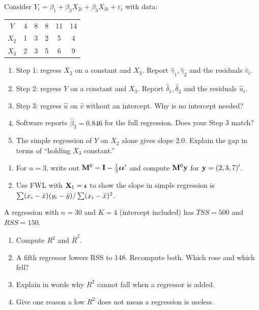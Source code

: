 \documentclass[11pt]{article}
\begin{document}
Consider $Y_i=\beta_1+\beta_2X_{2i}+\beta_3X_{3i}+\varepsilon_i$ with data:
\begin{center}
\begin{tabular}{c|ccccc}
$Y$ & 4 & 8 & 8 & 11 & 14 \\
$X_2$ & 1 & 3 & 2 & 5 & 4 \\
$X_3$ & 2 & 3 & 5 & 6 & 9
\end{tabular}
\end{center}
\begin{enumerate}[label=(\alph*)]
  \item Step 1: regress $X_2$ on a constant and $X_3$. Report $\hat\gamma_1,\hat\gamma_2$ and the residuals $\hat v_i$.
  \item Step 2: regress $Y$ on a constant and $X_3$. Report $\hat\delta_1,\hat\delta_2$ and the residuals $\hat u_i$.
  \item Step 3: regress $\hat u$ on $\hat v$ without an intercept. Why is no intercept needed?
  \item Software reports $\hat\beta_2=0.846$ for the full regression. Does your Step 3 match?
  \item The simple regression of $Y$ on $X_2$ alone gives slope $2.0$. Explain the gap in terms of ``holding $X_3$ constant.''
\end{enumerate}

\begin{enumerate}[label=(\alph*)]
  \item For $n=3$, write out $\mathbf{M}^0=\mathbf{I}-\tfrac13\bm{\iota}\bm{\iota}'$ and compute $\mathbf{M}^0\mathbf y$ for $\mathbf{y}=(2,3,7)'$.
  \item Use FWL with $\mathbf{X}_1=\bm{\iota}$ to show the slope in simple regression is $\sum(x_i-\bar{x})(y_i-\bar{y})/\sum(x_i-\bar{x})^2$.
\end{enumerate}

A regression with $n=30$ and $K=4$ (intercept included) has $TSS=500$ and $RSS=150$.
\begin{enumerate}[label=(\alph*)]
  \item Compute $R^2$ and $\bar R^2$.
  \item A fifth regressor lowers RSS to 148. Recompute both. Which rose and which fell?
  \item Explain in words why $R^2$ cannot fall when a regressor is added.
  \item Give one reason a low $R^2$ does not mean a regression is useless.
\end{enumerate}
\end{document}
